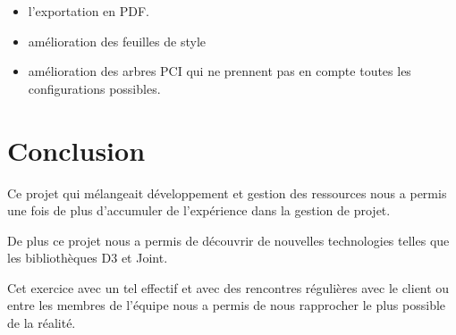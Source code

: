\documentclass [a4paper,11pt]{article}
\begin{document}
\begin{itemize}
\item l'exportation en PDF.
\item amélioration des feuilles de style
\item amélioration des arbres PCI qui ne prennent pas en compte toutes les configurations possibles.
\end{itemize}

\newpage

\section{Conclusion}
Ce projet qui mélangeait développement et gestion des ressources nous a permis une fois de plus d'accumuler de l'expérience dans la gestion de projet.
\newline

De plus ce projet nous a permis de découvrir de nouvelles technologies telles que les bibliothèques D3 et Joint.
\newline

Cet exercice avec un tel effectif et avec des rencontres régulières avec le client ou entre les membres de l'équipe nous a permis de nous rapprocher le plus possible de la réalité.

\newpage



\end{document}
